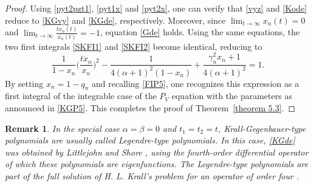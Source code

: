 \documentclass[10pt, reqno]{amsart}
\numberwithin{equation}{section}
\newtheorem{remark}{Remark}[section]
\numberwithin{equation}{section}
\begin{document}
\begin{proof}
Using \eqref{pyt2pzt1}, \eqref{pyt1x} and \eqref{pyt2x}, one can verify that \eqref{vyz} and \eqref{Kode} reduce to \eqref{KGvy} and \eqref{KGde}, respectively. Moreover, since $\lim_{t\to\infty} x_n(t)=0$ and $\lim_{t\to\infty}\frac{t\dot{x}_n(t)}{x_n(t)}=-1$, equation \eqref{Gde} holds. Using the same equations, the two first integrals \eqref{SKFI1} and \eqref{SKFI2} become identical, reducing to
\begin{equation*}
\frac{1}{1-x_n}\Big(\frac{t\dot{x}_n}{x_n}\Big)^2-\frac{1}{4(\alpha+1)^2(1-x_n)}+\frac{\gamma_n^2x_n+1}{4(\alpha+1)^2}=1.
\end{equation*}
By setting $x_n=1-q_n$ and recalling \eqref{FIP5}, one recognizes this expression as a first integral of the integrable case of the $P_V$ equation with the parameters as announced in \eqref{KGP5}. This completes the proof of Theorem~\ref{theorem 5.3}.
\end{proof}
\begin{remark}\label{remark 5.2}
\emph{In the special case $\alpha=\beta=0$ and $t_1=t_2=t$, Krall-Gegenbauer-type polynomials are usually called Legendre-type polynomials. In this case, \eqref{KGde} was obtained by Littlejohn and Shore \cite{LLS}, using the fourth-order differential operator of which these polynomials are eigenfunctions. The Legendre-type polynomials are part of the full solution of H. L. Krall's problem for an operator of order four \cite{K2}.}
\end{remark}
\end{document}
